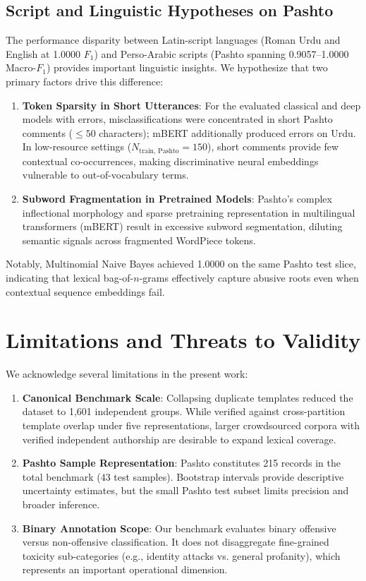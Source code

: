 \documentclass[11pt,a4paper]{article}
\begin{document}
\subsection{Script and Linguistic Hypotheses on Pashto}
The performance disparity between Latin-script languages (Roman Urdu and English at 1.0000 $F_1$) and Perso-Arabic scripts (Pashto spanning 0.9057--1.0000 Macro-$F_1$) provides important linguistic insights. We hypothesize that two primary factors drive this difference:
\begin{enumerate}
    \item \textbf{Token Sparsity in Short Utterances}: For the evaluated classical and deep models with errors, misclassifications were concentrated in short Pashto comments ($\le 50$ characters); mBERT additionally produced errors on Urdu. In low-resource settings ($N_{\text{train, Pashto}} = 150$), short comments provide few contextual co-occurrences, making discriminative neural embeddings vulnerable to out-of-vocabulary terms.
    \item \textbf{Subword Fragmentation in Pretrained Models}: Pashto's complex inflectional morphology and sparse pretraining representation in multilingual transformers (mBERT) result in excessive subword segmentation, diluting semantic signals across fragmented WordPiece tokens.
\end{enumerate}
Notably, Multinomial Naive Bayes achieved 1.0000 on the same Pashto test slice, indicating that lexical bag-of-$n$-grams effectively capture abusive roots even when contextual sequence embeddings fail.

\section{Limitations and Threats to Validity}\label{sec:limitations}

We acknowledge several limitations in the present work:
\begin{enumerate}
    \item \textbf{Canonical Benchmark Scale}: Collapsing duplicate templates reduced the dataset to 1,601 independent groups. While verified against cross-partition template overlap under five representations, larger crowdsourced corpora with verified independent authorship are desirable to expand lexical coverage.
    \item \textbf{Pashto Sample Representation}: Pashto constitutes 215 records in the total benchmark (43 test samples). Bootstrap intervals provide descriptive uncertainty estimates, but the small Pashto test subset limits precision and broader inference.
    \item \textbf{Binary Annotation Scope}: Our benchmark evaluates binary offensive versus non-offensive classification. It does not disaggregate fine-grained toxicity sub-categories (e.g., identity attacks vs. general profanity), which represents an important operational dimension.
\end{enumerate}
\end{document}
